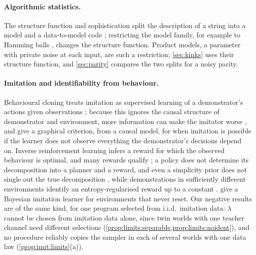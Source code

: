 \paragraph{Algorithmic statistics.}
The structure function and sophistication split the description of a string into a model and a data-to-model code \citep{koppel1987complexity,gacs2001algorithmic,vereshchagin2004kolmogorov,vereshchagin2017algorithmic}; restricting the model family, for example to Hamming balls \citep{vereshchagin2010rate}, changes the structure function. Product models, a parameter with private noise at each input, are such a restriction; \cref{sec:kinks} uses their structure function, and \cref{sec:parity} compares the two splits for a noisy parity.

\paragraph{Imitation and identifiability from behaviour.}
Behavioural cloning treats imitation as supervised learning of a demonstrator's actions given observations \citep{bain1999framework,pomerleau1991efficient,dehaan2019causal}; because this ignores the causal structure of demonstrator and environment, more information can make the imitator worse \citep{dehaan2019causal}, and \citet{zhang2020causal} give a graphical criterion, from a causal model, for when imitation is possible if the learner does not observe everything the demonstrator's decisions depend on. Inverse reinforcement learning infers a reward for which the observed behaviour is optimal, and many rewards qualify \citep{ng2000algorithms}; a policy does not determine its decomposition into a planner and a reward, and even a simplicity prior does not single out the true decomposition \citep{armstrong2018occam}, while demonstrations in sufficiently different environments identify an entropy-regularised reward up to a constant \citep{cao2021identifiability}. \citet{cohen2022fully} give a Bayesian imitation learner for environments that never reset. Our negative results are of the same kind, for one program selected from i.i.d.\ imitation data: $\lambda$ cannot be chosen from imitation data alone, since twin worlds with one teacher channel need different selections (\cref{prop:limits:separable,prop:limits:noident}), and no procedure reliably copies the sampler in each of several worlds with one data law (\cref{prop:imit:limits}(a)).

